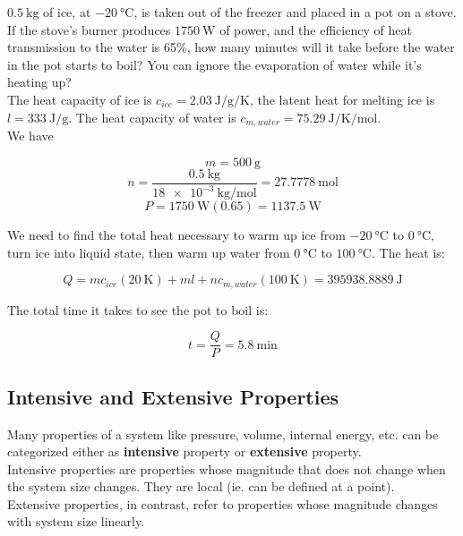 \documentclass[12pt, a4paper]{article}
\newcounter{exa}
\begin{document}
\begin{texample}
$\SI{0.5}{\kilo\gram}$ of ice, at $\SI{-20}{\celsius}$, is taken out of the freezer and placed in a pot on a stove. If the stove's burner produces $\SI{1750}{\watt}$ of power, and the efficiency of heat transmission to the water is 65\%, how many minutes will it take before the water in the pot starts to boil? You can ignore the evaporation of water while it's heating up? \\

The heat capacity of ice is $c_{ice}=\SI{2.03}{\joule\per\gram\per\kelvin}$, the latent heat for melting ice is $l=\SI{333}{\joule\per\gram}$. The heat capacity of water is $c_{m,water}=\SI{75.29}{\joule\per\kelvin\per\mole}$. \\

We have

\[m=\SI{500}{\gram}\]
\[n=\frac{\SI{0.5}{\kilo\gram}}{\SI{18e-3}{\kilo\gram\per\mole}}=\SI{27.7778}{\mole}\]
\[P=\SI{1750}{\watt} (0.65)=\SI{1137.5}{\watt}\]

We need to find the total heat necessary to warm up ice from $\SI{-20}{\celsius}$ to $\SI{0}{\celsius}$, turn ice into liquid state, then warm up water from $\SI{0}{\celsius}$ to $\SI{100}{\celsius}$. The heat is:

\[Q=mc_{ice}(\SI{20}{\kelvin})+ml+nc_{m,water}(\SI{100}{\kelvin})=\SI{395938.8889}{\joule}\]

The total time it takes to see the pot to boil is:

\[t=\frac{Q}{P}=\SI{5.8}{\minute}\]
\end{texample}

\subsection{Intensive and Extensive Properties}

Many properties of a system like pressure, volume, internal energy, etc. can be categorized either as \textbf{intensive} property or \textbf{extensive} property. \\

Intensive properties are properties whose magnitude that does not change when the system size changes. They are local (ie. can be defined at a point). \\

Extensive properties, in contrast, refer to properties whose magnitude changes with system size linearly. \\
\end{document}
